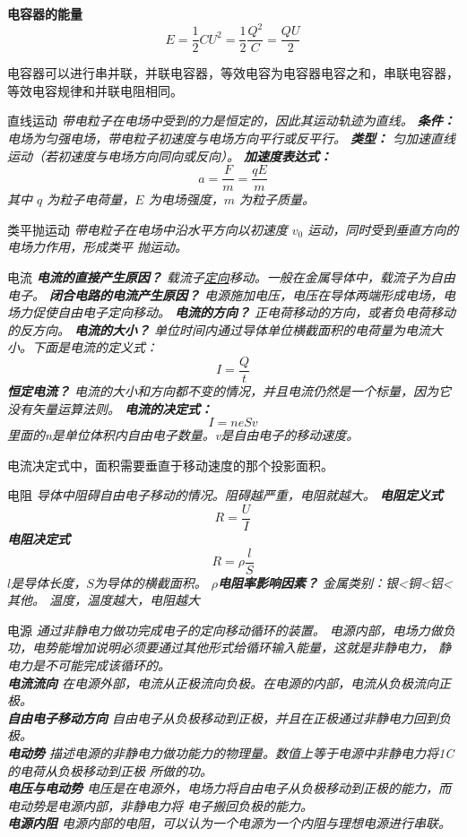 \documentclass[a4paper, 12pt]{article}
\newcommand{\defitem}[2]{
  \noindent \textsf{#1} \hspace{1em} \itshape{#2} 
}
\newcommand{\formula}[2]{
  \noindent \textbf{#2}  \[ #1 \]
}
\newcommand{\noticebox}[1]{
  \begin{arcbox}
    \normalfont #1
  \end{arcbox}
}
\begin{document}
\formula{E = \frac{1}{2} C U^2 = \frac{1}{2}\frac{Q^2}{C} = \frac{Q U}{2}}{电容器的能量}
\noticebox{
  电容器可以进行串并联，并联电容器，等效电容为电容器电容之和，串联电容器，等效电容规律和并联电阻相同。
}
\defitem{直线运动}{
  带电粒子在电场中受到的力是恒定的，因此其运动轨迹为直线。
  \textbf{条件：} 电场为匀强电场，带电粒子初速度与电场方向平行或反平行。
  \textbf{类型：} 匀加速直线运动（若初速度与电场方向同向或反向）。
  \textbf{加速度表达式：}
  \[
    a = \frac{F}{m} = \frac{qE}{m}
  \]
  其中 $q$ 为粒子电荷量，$E$ 为电场强度，$m$ 为粒子质量。\\
}
\defitem{类平抛运动}{
  带电粒子在电场中沿水平方向以初速度 $v_0$ 运动，同时受到垂直方向的电场力作用，形成类平
  抛运动。\\
}
\defitem{电流}{
  \textbf{电流的直接产生原因？}
  载流子\underline{定向}移动。一般在金属导体中，载流子为自由电子。
  \textbf{闭合电路的电流产生原因？}
  电源施加电压，电压在导体两端形成电场，电场力促使自由电子定向移动。
  \textbf{电流的方向？}
  正电荷移动的方向，或者负电荷移动的反方向。
  \textbf{电流的大小？}
  单位时间内通过导体单位横截面积的电荷量为电流大小。下面是电流的定义式：
  \[I=\frac Qt\]
  \textbf{恒定电流？}
  电流的大小和方向都不变的情况，并且电流仍然是一个标量，因为它没有矢量运算法则。
  \textbf{电流的决定式：}
  \[I=neSv\]
  里面的n是单位体积内自由电子数量。v是自由电子的移动速度。
}
\noticebox{
  电流决定式中，面积需要垂直于移动速度的那个投影面积。
}
\defitem{电阻}{
  导体中阻碍自由电子移动的情况。阻碍越严重，电阻就越大。
  \textbf{电阻定义式}
  \[R=\frac UI\]
  \textbf{电阻决定式}
  \[R=\rho\frac lS\]
  $l$是导体长度，$S$为导体的横截面积。
  \textbf{$\rho$电阻率影响因素？}
  金属类别：银<铜<铝<其他。
  温度，温度越大，电阻越大\\
}
\defitem{电源}{
  通过非静电力做功完成电子的定向移动循环的装置。
  电源内部，电场力做负功，电势能增加说明必须要通过其他形式给循环输入能量，这就是非静电力，
  静电力是不可能完成该循环的。\\
  \textbf{电流流向}
  在电源外部，电流从正极流向负极。在电源的内部，电流从负极流向正极。\\
  \textbf{自由电子移动方向}
  自由电子从负极移动到正极，并且在正极通过非静电力回到负极。\\
  \textbf{电动势}
  描述电源的非静电力做功能力的物理量。数值上等于电源中非静电力将1C的电荷从负极移动到正极
  所做的功。\\
  \textbf{电压与电动势}
  电压是在电源外，电场力将自由电子从负极移动到正极的能力，而电动势是电源内部，非静电力将
  电子搬回负极的能力。\\
  \textbf{电源内阻}
  电源内部的电阻，可以认为一个电源为一个内阻与理想电源进行串联。\\
}
\end{document}
